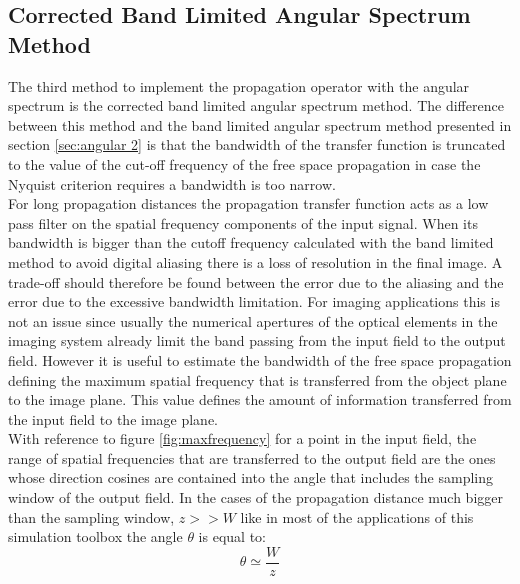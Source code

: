  \subsection{Corrected Band Limited Angular Spectrum Method}
 \label{sec:angular3}
 The third method to implement the propagation operator with the angular spectrum is the corrected band limited angular spectrum method. The difference between this method and the band limited angular spectrum method presented in section \ref{sec:angular 2} is that the bandwidth of the transfer function is truncated to the value of the cut-off frequency of the free space propagation in case the Nyquist criterion requires a bandwidth is too narrow.\\
 For long propagation distances the propagation transfer function acts as a low pass filter on the spatial frequency components of the input signal. When its bandwidth is bigger than the cutoff frequency calculated with the band limited method to avoid digital aliasing there is a loss of resolution in the final image. A trade-off should therefore be found between the error due to the aliasing and the error due to the excessive bandwidth limitation. For imaging applications this is not an issue since usually the numerical apertures of the optical elements in the imaging system already limit the band passing from the input field to the output field. However it is useful to estimate the bandwidth of the free space propagation defining the maximum spatial frequency that is transferred from the object plane to the image plane. This value defines the amount of information transferred from the input field to the image plane.\\
 With reference to figure \ref{fig:maxfrequency} for a point in the input field, the range of spatial frequencies that are transferred to the output field are the ones whose direction cosines are contained into the angle that includes the sampling window of the output field. In the cases of the propagation distance much bigger than the sampling window, $z>>W $ like in most of the applications of this simulation toolbox the angle $\theta$ is equal to:
 \begin{equation}
 \label{eq:BL12}
 \theta \simeq\dfrac{W}{z}
 \end{equation}
